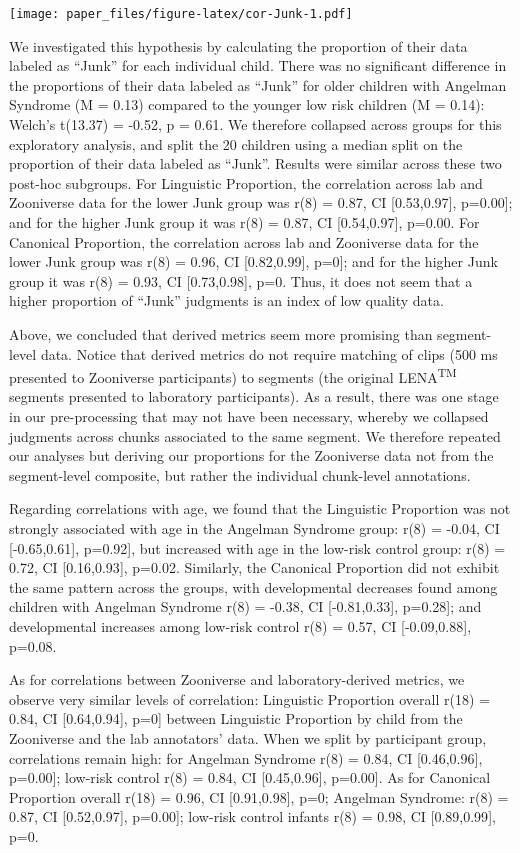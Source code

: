 \documentclass[english,,man,floatsintext]{apa6}
\begin{document}
\texttt{[image: paper\_files/figure-latex/cor-Junk-1.pdf]}

We investigated this hypothesis by calculating the proportion of their data labeled as \enquote{Junk} for each individual child. There was no significant difference in the proportions of their data labeled as \enquote{Junk} for older children with Angelman Syndrome (M = 0.13) compared to the younger low risk children (M = 0.14): Welch's t(13.37) = -0.52, p = 0.61. We therefore collapsed across groups for this exploratory analysis, and split the 20 children using a median split on the proportion of their data labeled as \enquote{Junk}. Results were similar across these two post-hoc subgroups. For Linguistic Proportion, the correlation across lab and Zooniverse data for the lower Junk group was r(8) = 0.87, CI {[}0.53,0.97{]}, p=0.00{]}; and for the higher Junk group it was r(8) = 0.87, CI {[}0.54,0.97{]}, p=0.00. For Canonical Proportion, the correlation across lab and Zooniverse data for the lower Junk group was r(8) = 0.96, CI {[}0.82,0.99{]}, p=0{]}; and for the higher Junk group it was r(8) = 0.93, CI {[}0.73,0.98{]}, p=0. Thus, it does not seem that a higher proportion of \enquote{Junk} judgments is an index of low quality data.

Above, we concluded that derived metrics seem more promising than segment-level data. Notice that derived metrics do not require matching of clips (500 ms presented to Zooniverse participants) to segments (the original LENA\textsuperscript{TM} segments presented to laboratory participants). As a result, there was one stage in our pre-processing that may not have been necessary, whereby we collapsed judgments across chunks associated to the same segment. We therefore repeated our analyses but deriving our proportions for the Zooniverse data not from the segment-level composite, but rather the individual chunk-level annotations.

Regarding correlations with age, we found that the Linguistic Proportion was not strongly associated with age in the Angelman Syndrome group: r(8) = -0.04, CI {[}-0.65,0.61{]}, p=0.92{]}, but increased with age in the low-risk control group: r(8) = 0.72, CI {[}0.16,0.93{]}, p=0.02. Similarly, the Canonical Proportion did not exhibit the same pattern across the groups, with developmental decreases found among children with Angelman Syndrome r(8) = -0.38, CI {[}-0.81,0.33{]}, p=0.28{]}; and developmental increases among low-risk control r(8) = 0.57, CI {[}-0.09,0.88{]}, p=0.08.

As for correlations between Zooniverse and laboratory-derived metrics, we observe very similar levels of correlation: Linguistic Proportion overall r(18) = 0.84, CI {[}0.64,0.94{]}, p=0{]} between Linguistic Proportion by child from the Zooniverse and the lab annotators' data. When we split by participant group, correlations remain high: for Angelman Syndrome r(8) = 0.84, CI {[}0.46,0.96{]}, p=0.00{]}; low-risk control r(8) = 0.84, CI {[}0.45,0.96{]}, p=0.00{]}. As for Canonical Proportion overall r(18) = 0.96, CI {[}0.91,0.98{]}, p=0; Angelman Syndrome: r(8) = 0.87, CI {[}0.52,0.97{]}, p=0.00{]}; low-risk control infants r(8) = 0.98, CI {[}0.89,0.99{]}, p=0.
\end{document}
